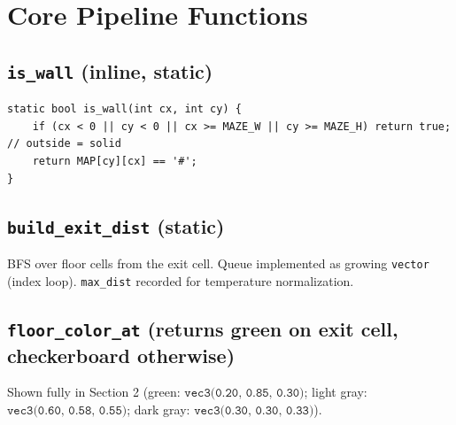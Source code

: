 \section{Core Pipeline Functions}

\subsection{\texttt{is\_wall} (inline, static)}
\begin{verbatim}
static bool is_wall(int cx, int cy) {
    if (cx < 0 || cy < 0 || cx >= MAZE_W || cy >= MAZE_H) return true;  // outside = solid
    return MAP[cy][cx] == '#';
}
\end{verbatim}


\subsection{\texttt{build\_exit\_dist} (static)}
BFS over floor cells from the exit cell. Queue implemented as growing \texttt{vector} (index loop). \texttt{max\_dist} recorded for temperature normalization.

\subsection{\texttt{floor\_color\_at} (returns green on exit cell, checkerboard otherwise)}
Shown fully in Section 2 (green: $\texttt{vec3(0.20, 0.85, 0.30)}$; light gray: $\texttt{vec3(0.60, 0.58, 0.55)}$; dark gray: $\texttt{vec3(0.30, 0.30, 0.33)}$).


